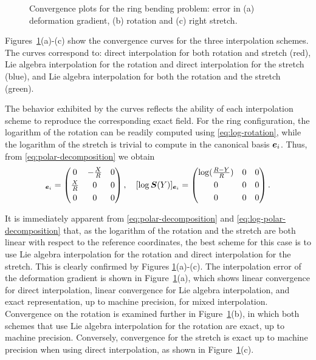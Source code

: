 \documentclass[12pt]{article}
\newcommand{\mbs}[1]{\boldsymbol{#1}}
\def\bS{{\mbs{S}}} \def\bT{{\mbs{T}}} \def\bU{{\mbs{U}}}
\begin{document}
\begin{figure}[htbp]
\begin{center}
    \caption{Convergence plots for the ring bending problem: error in
      (a) deformation gradient, (b) rotation and (c) right stretch.}
    \label{fig:ring-refinement}
  \end{center}
\end{figure}

Figures~\ref{fig:ring-refinement}(a)-(c) show the convergence curves
for the three interpolation schemes. The curves correspond to: direct
interpolation for both rotation and stretch (red), Lie algebra
interpolation for the rotation and direct interpolation for the
stretch (blue), and Lie algebra interpolation for both the rotation
and the stretch (green).

The behavior exhibited by the curves reflects the ability of each interpolation
scheme to reproduce the corresponding exact field. For the ring configuration,
the logarithm of the rotation can be readily computed using
\eqref{eq:log-rotation}, while the logarithm of the stretch is trivial to
compute in the canonical basis $\be_i$. Thus, from
\eqref{eq:polar-decomposition} we obtain
\begin{equation}
  [\log \bR(X)]_{\be_i} =
  \begin{pmatrix}
    0 & - \frac{X}{R} & 0
    \\[0.3em]
    \frac{X}{R} & 0  & 0
    \\[0.3em]
    0 & 0 & 0
  \end{pmatrix},
  \quad
  [\log \bS(Y)]_{\be_i} =
  \begin{pmatrix}
    \log (\frac{R-Y}{R})  & 0 & 0
    \\[0.3em]
    0 & 0 & 0
    \\[0.3em]
    0 & 0 & 0
  \end{pmatrix}.
  \label{eq:log-polar-decomposition} 
\end{equation}

It is immediately apparent from \eqref{eq:polar-decomposition} and
\eqref{eq:log-polar-decomposition} that, as the logarithm of the
rotation and the stretch are both linear with respect to the reference
coordinates, the best scheme for this case is to use Lie algebra
interpolation for the rotation and direct interpolation for the
stretch. This is clearly confirmed by Figures
\ref{fig:ring-refinement}(a)-(c). The interpolation error of the
deformation gradient is shown in Figure~\ref{fig:ring-refinement}(a),
which shows linear convergence for direct interpolation, linear
convergence for Lie algebra interpolation, and exact representation,
up to machine precision, for mixed interpolation. Convergence on the
rotation is examined further in Figure~\ref{fig:ring-refinement}(b),
in which both schemes that use Lie algebra interpolation for the
rotation are exact, up to machine precision. Conversely, convergence
for the stretch is exact up to machine precision when using direct
interpolation, as shown in Figure~\ref{fig:ring-refinement}(c).
\end{document}
